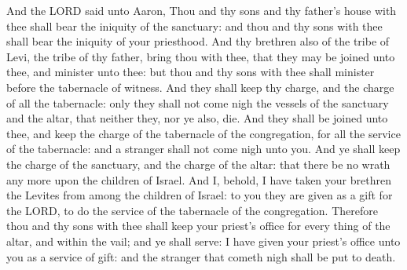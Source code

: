  And the LORD said unto Aaron, Thou and thy sons and thy
father's house with thee shall bear the iniquity of the sanctuary: and
thou and thy sons with thee shall bear the iniquity of your priesthood.
 And thy brethren also of the tribe of Levi, the tribe of
thy father, bring thou with thee, that they may be joined unto thee, and
minister unto thee: but thou and thy sons with thee shall minister
before the tabernacle of witness.  And they shall keep thy
charge, and the charge of all the tabernacle: only they shall not come
nigh the vessels of the sanctuary and the altar, that neither they, nor
ye also, die.  And they shall be joined unto thee, and keep
the charge of the tabernacle of the congregation, for all the service of
the tabernacle: and a stranger shall not come nigh unto you.
 And ye shall keep the charge of the sanctuary, and the
charge of the altar: that there be no wrath any more upon the children
of Israel.  And I, behold, I have taken your brethren the
Levites from among the children of Israel: to you they are given as a
gift for the LORD, to do the service of the tabernacle of the
congregation.  Therefore thou and thy sons with thee shall
keep your priest's office for every thing of the altar, and within the
vail; and ye shall serve: I have given your priest's office unto you as
a service of gift: and the stranger that cometh nigh shall be put to
death.

